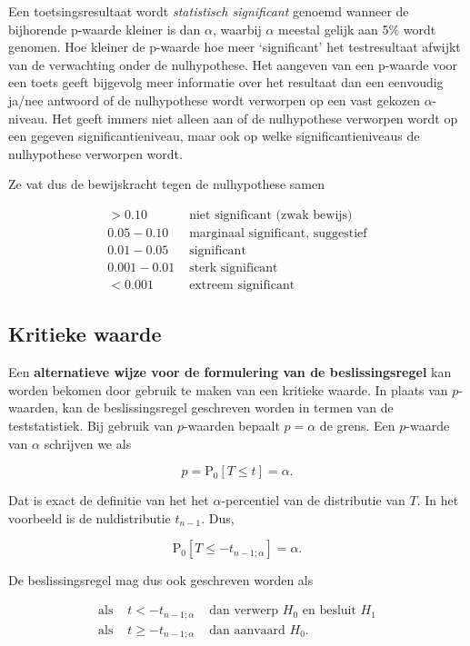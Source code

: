 \documentclass[
  12pt,dutch,coursenotes]{book}
\theoremstyle{definition}
\theoremstyle{definition}
\theoremstyle{definition}
\theoremstyle{definition}
\theoremstyle{remark}
\begin{document}
Een toetsingsresultaat wordt \emph{statistisch significant} genoemd
wanneer de bijhorende p-waarde kleiner is dan \(\alpha\), waarbij \(\alpha\)
meestal gelijk aan 5\% wordt genomen. Hoe kleiner de p-waarde hoe meer
`significant' het testresultaat afwijkt van de verwachting onder de
nulhypothese. Het aangeven van een p-waarde voor een toets geeft bijgevolg
meer informatie over het resultaat dan een eenvoudig ja/nee antwoord of de
nulhypothese wordt verworpen op een vast gekozen \(\alpha\)-niveau. Het geeft immers niet alleen aan of de nulhypothese verworpen wordt op een gegeven significantieniveau, maar ook op welke significantieniveaus de nulhypothese verworpen wordt.

Ze vat dus de bewijskracht tegen de nulhypothese samen

\[\begin{array}{cl}>0.10 & \text{ niet significant (zwak bewijs)}\\0.05-0.10 & \text{ marginaal significant, suggestief}\\0.01-0.05 & \text{ significant}\\0.001-0.01 & \text{ sterk significant}\\<0.001 & \text{ extreem significant}\end{array}\]

\hypertarget{kritieke-waarde}{%
\subsection{Kritieke waarde}\label{kritieke-waarde}}

Een \textbf{alternatieve wijze voor de formulering van de beslissingsregel} kan worden bekomen door gebruik te maken van een kritieke waarde.
In plaats van \(p\)-waarden, kan de beslissingsregel geschreven worden in termen van de teststatistiek.
Bij gebruik van \(p\)-waarden bepaalt \(p=\alpha\) de grens.
Een \(p\)-waarde van \(\alpha\) schrijven we als

\[p=\text{P}_0 \left[ T \leq t \right]=\alpha.\]

Dat is exact de definitie van het het \(\alpha\)-percentiel van de distributie van \(T\).
In het voorbeeld is de nuldistributie \(t_{n-1}\).
Dus,

\[\text{P}_0\left[T\leq -t_{n-1;\alpha}\right]=\alpha.\]

De beslissingsregel mag dus ook geschreven worden als

\begin{eqnarray*}
\text{als } & t< -t_{n-1;\alpha} & \text{ dan verwerp }H_0\text{ en besluit }H_1 \\
  \text{als } & t\geq -t_{n-1;\alpha} & \text{ dan aanvaard }H_0.
\end{eqnarray*}
\end{document}
